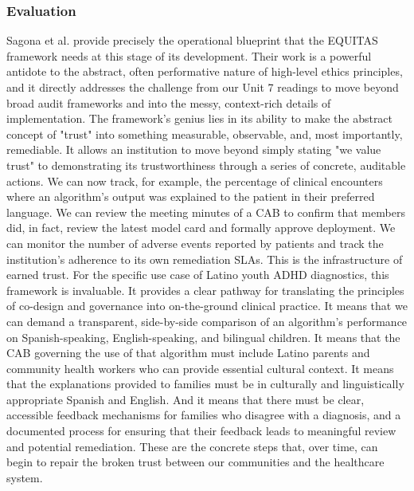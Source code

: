 \documentclass[11pt,twoside]{article}
\begin{document}
\newpage
\vspace{-0.3cm}
\subsubsection*{Evaluation}

\vspace{-0.3cm}
Sagona et al. provide precisely the operational blueprint that the EQUITAS framework needs at this stage of its development. Their work is a powerful antidote to the abstract, often performative nature of high-level ethics principles, and it directly addresses the challenge from our Unit 7 readings to move beyond broad audit frameworks and into the messy, context-rich details of implementation. The framework's genius lies in its ability to make the abstract concept of "trust" into something measurable, observable, and, most importantly, remediable. It allows an institution to move beyond simply stating "we value trust" to demonstrating its trustworthiness through a series of concrete, auditable actions. We can now track, for example, the percentage of clinical encounters where an algorithm's output was explained to the patient in their preferred language. We can review the meeting minutes of a CAB to confirm that members did, in fact, review the latest model card and formally approve deployment. We can monitor the number of adverse events reported by patients and track the institution's adherence to its own remediation SLAs. This is the infrastructure of earned trust. For the specific use case of Latino youth ADHD diagnostics, this framework is invaluable. It provides a clear pathway for translating the principles of co-design and governance into on-the-ground clinical practice. It means that we can demand a transparent, side-by-side comparison of an algorithm's performance on Spanish-speaking, English-speaking, and bilingual children. It means that the CAB governing the use of that algorithm must include Latino parents and community health workers who can provide essential cultural context. It means that the explanations provided to families must be in culturally and linguistically appropriate Spanish and English. And it means that there must be clear, accessible feedback mechanisms for families who disagree with a diagnosis, and a documented process for ensuring that their feedback leads to meaningful review and potential remediation. These are the concrete steps that, over time, can begin to repair the broken trust between our communities and the healthcare system.
\end{document}
